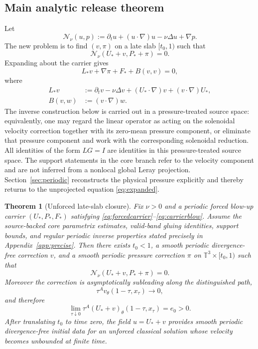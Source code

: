 \documentclass[11pt]{article}
\newtheorem{theorem}{Theorem}[section]
\numberwithin{equation}{section}
\newcommand{\T}{\mathbb T^3}
\newcommand{\N}{\mathcal N}
\begin{document}
\subsection{Main analytic release theorem}
Let
\begin{equation}
\N_\nu(u,p):=\partial_tu+(u\cdot\nabla)u-\nu\Delta u+\nabla p.
\label{eq:residualdef}
\end{equation}
The new problem is to find \((v,\pi)\) on a late slab \([t_0,1)\) such that
\begin{equation}
\N_\nu(U_*+v,P_*+\pi)=0.
\label{eq:exactgoal}
\end{equation}
Expanding about the carrier gives
\begin{equation}
L_*v+\nabla\pi+F_*+B(v,v)=0,
\label{eq:expanded}
\end{equation}
where
\begin{align}
L_*v&:=\partial_tv-\nu\Delta v+(U_*\cdot\nabla)v+(v\cdot\nabla)U_*,\label{eq:linearized}\\
B(v,w)&:=(v\cdot\nabla)w.\label{eq:bilinear}
\end{align}
The inverse construction below is carried out in a pressure-treated source space: equivalently, one may regard the linear operator as acting on the solenoidal velocity correction together with its zero-mean pressure component, or eliminate that pressure component and work with the corresponding solenoidal reduction.  All identities of the form \(LG=I\) are identities in this pressure-treated source space.  The support statements in the core branch refer to the velocity component and are not inferred from a nonlocal global Leray projection.  Section~\ref{sec:periodic} reconstructs the physical pressure explicitly and thereby returns to the unprojected equation \eqref{eq:expanded}.

\begin{theorem}[Unforced late-slab closure]\label{thm:main}
Fix \(\nu>0\) and a periodic forced blow-up carrier \((U_*,P_*,F_*)\) satisfying \eqref{eq:forcedcarrier}--\eqref{eq:carrierblow}.  Assume the source-backed core parametrix estimates, valid-band gluing identities, support bounds, and regular periodic inverse properties stated precisely in Appendix~\ref{app:precise}.  Then there exists \(t_0<1\), a smooth periodic divergence-free correction \(v\), and a smooth periodic pressure correction \(\pi\) on \(\T\times[t_0,1)\) such that
\[
\N_\nu(U_*+v,P_*+\pi)=0.
\]
Moreover the correction is asymptotically subleading along the distinguished path,
\[
\tau^A v_\theta(1-\tau,x_\tau)\longrightarrow0,
\]
and therefore
\[
\lim_{\tau\downarrow0}\tau^A(U_*+v)_\theta(1-\tau,x_\tau)=e_0>0.
\]
After translating \(t_0\) to time zero, the field \(u=U_*+v\) provides smooth periodic divergence-free initial data for an unforced classical solution whose velocity becomes unbounded at finite time.
\end{theorem}
\end{document}
